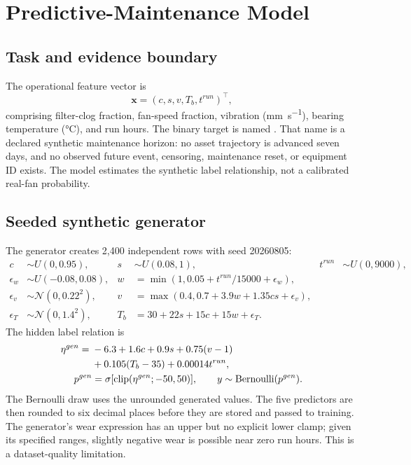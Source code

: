 \chapter{Predictive-Maintenance Model}
\label{ch:model}

\section{Task and evidence boundary}
The operational feature vector is
\begin{equation}\mathbf{x}=(c,s,v,T_b,t^{run})^\top,\end{equation}
comprising filter-clog fraction, fan-speed fraction, vibration (\si{\milli\meter\per\second}), bearing temperature (\si{\celsius}), and run hours. The binary target is named . That name is a declared synthetic maintenance horizon: no asset trajectory is advanced seven days, and no observed future event, censoring, maintenance reset, or equipment ID exists. The model estimates the synthetic label relationship, not a calibrated real-fan probability.

\section{Seeded synthetic generator}
The generator creates 2,400 independent rows with seed 20260805:
\begin{align}
c&\sim U(0,0.95),&s&\sim U(0.08,1),&t^{run}&\sim U(0,9000),\\
\epsilon_w&\sim U(-0.08,0.08),&w&=\min(1,0.05+t^{run}/15000+\epsilon_w),\\
\epsilon_v&\sim\mathcal N(0,0.22^2),&v&=\max(0.4,0.7+3.9w+1.35cs+\epsilon_v),\\
\epsilon_T&\sim\mathcal N(0,1.4^2),&T_b&=30+22s+15c+15w+\epsilon_T.
\end{align}
The hidden label relation is
\begin{align}
\eta^{gen}={}&-6.3+1.6c+0.9s+0.75(v-1)\\
&+0.105(T_b-35)+0.00014t^{run},\\
p^{gen}&=\sigma[\operatorname{clip}(\eta^{gen};-50,50)],\qquad y\sim\operatorname{Bernoulli}(p^{gen}).
\end{align}
The Bernoulli draw uses the unrounded generated values. The five predictors are then rounded to six decimal places before they are stored and passed to training. The generator's wear expression has an upper but no explicit lower clamp; given its specified ranges, slightly negative wear is possible near zero run hours. This is a dataset-quality limitation.

